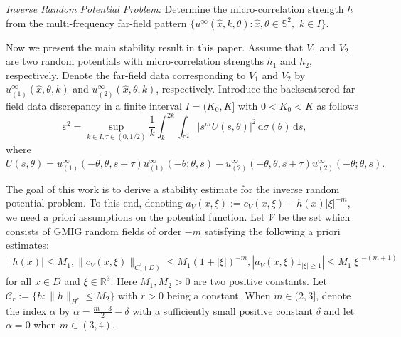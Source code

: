 \documentclass[reqno, 12pt]{amsart}
\numberwithin{equation}{section}
\begin{document}
{\it Inverse Random Potential Problem:} Determine the micro-correlation strength $h$ from the multi-frequency far-field pattern $\{u^\infty(\hat{x},k, \theta): \hat{x}, \theta\in\mathbb S^2, \,\, k\in I\}$.

Now we present the main stability result in this paper.
Assume that $V_1$ and $V_2$ are two random potentials with micro-correlation strengths $h_1$ and $h_2$, respectively. 
Denote the far-field data corresponding to $V_1$ and $V_2$ by
$u^\infty_{(1)}(\hat{x},\theta,k)$ and $u^\infty_{(2)}(\hat{x},\theta,k)$, respectively. 
Introduce the backscattered far-field data discrepancy in a finite interval $I = (K_0, K]$ with $0<K_0<K$ as follows 
\[
\varepsilon^2 =  \sup_{k\in I, \tau\in(0, 1/2)} \frac{1}{k}\int_k^{2k}\int_{\mathbb S^2}|s^{m}U(s,\theta)|^2\,\mathrm{d}\sigma(\theta)\,\mathrm{d}s, 
\] where \[U(s,\theta)=\overline{u_{(1)}^\infty(-\theta, \theta,s+\tau)} {u_{(1)}^\infty(-\theta;\theta,  s)}-\overline{u_{(2)}^\infty(-\theta, \theta,s+\tau)} {u_{(2)}^\infty(-\theta;\theta,  s)}.\]

The goal of this work is to derive a stability estimate for the inverse random potential problem. To this end,
denoting $a_V(x,\xi):=c_V(x,\xi)-h(x)|\xi|^{-m}$, we need a priori assumptions on the potential function. Let $\mathcal V$ be the set
which consists of GMIG random fields of order $-m$ satisfying the following a priori estimates: 
\begin{align*}
|h(x)| \le M_1 , \|c_V(x,\xi)\|_{C^1_x(D)} \le M_1(1+|\xi|)^{-m}, |a_V(x, \xi)1_{|\xi|\ge 1}| \le M_1|\xi|^{-(m+1)}
\end{align*}
for all $x\in D$ and $\xi\in\mathbb R^3$. Here $M_1, M_2>0$ are two positive constants.
Let $\mathcal C_r:=\{h:\|h\|_{H^r} \le M_2\}$ with $r>0$ being a constant. When $m \in (2,3]$, denote the index $\alpha$ by $
		\alpha=
			\frac{m-3}{2}-\delta
	$ with a sufficiently small positive constant $\delta$ and  let $\alpha=0$ when $m  \in (3,4).$
\end{document}
